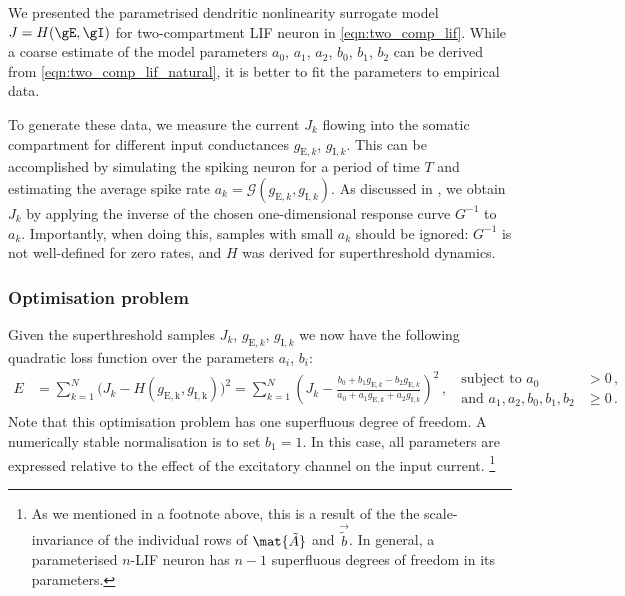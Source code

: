 We presented the parametrised dendritic nonlinearity surrogate model $J = H(\gE, \gI)$ for two-compartment LIF neuron in \cref{eqn:two_comp_lif}.
While a coarse estimate of the model parameters $a_0$, $a_1$, $a_2$, $b_0$, $b_1$, $b_2$ can be derived from \cref{eqn:two_comp_lif_natural}, it is better to fit the parameters to empirical data.

To generate these data, we measure the current $J_k$ flowing into the somatic compartment for different input conductances $g_{\mathrm{E}, k}$, $g_{\mathrm{I}, k}$.
This can be accomplished by simulating the spiking neuron for a period of time $T$ and estimating the average spike rate $a_k = \mathscr{G}( g_{\mathrm{E}, k}, g_{\mathrm{I}, k})$.
As discussed in , we obtain $J_k$ by applying the inverse of the chosen one-dimensional response curve $G^{-1}$ to $a_k$.
Importantly, when doing this, samples with small $a_k$ should be ignored: $G^{-1}$ is not well-defined for zero rates, and $H$ was derived for superthreshold dynamics.

\subsubsection{Optimisation problem}
Given the superthreshold samples $J_k$, $g_{\mathrm{E}, k}$, $g_{\mathrm{I}, k}$ we now have the following quadratic loss function over the parameters $a_i$, $b_i$:
\begin{align}
	E &=
		\sum_{k = 1}^N \bigl( J_k - H(g_\mathrm{E, k}, g_\mathrm{I, k}) \bigr)^2
	= \sum_{k = 1}^N \left( \! J_k - \frac{b_0 + b_1 g_{\mathrm{E}, k} - b_2 g_{\mathrm{E}, k}}{a_0 + a_1 g_{\mathrm{E}, k} + a_2  g_{\mathrm{I}, k}} \right)^2 \,,
	\;\; \begin{aligned}\text{subject to } a_0 &> 0 \,, \\ \text{and } a_1, a_2, b_0, b_1, b_2 &\geq  0 \,.\end{aligned}
	\label{eqn:two_comp_optimal_parameters}
\end{align}
Note that this optimisation problem has one superfluous degree of freedom.
A numerically stable normalisation is to set $b_1 = 1$.
In this case, all parameters are expressed relative to the effect of the excitatory channel on the input current.%
\footnote{As we mentioned in a footnote above, this is a result of the the scale-invariance of the individual rows of $\mat{\tilde A}$ and $\vec{\tilde b}$. In general, a parameterised $n$-LIF neuron has $n - 1$ superfluous degrees of freedom in its parameters.}

